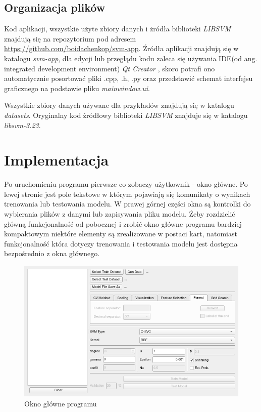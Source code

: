\documentclass[paper=a4, fontsize=11pt]{scrartcl} %
\numberwithin{equation}{section} %
\numberwithin{figure}{section} %
\begin{document}
    \endgroup

\subsection{Organizacja plików}
    \par Kod aplikacji, wszystkie użyte zbiory danych i żródła biblioteki \textit{LIBSVM}
    znajdują się na repozytorium pod adresem \url{https://github.com/boidachenkop/svm-app}.
    Źródła aplikacji znajdują się w katalogu \textit{svm-app}, dla edycji lub przeglądu kodu
    zaleca się używania IDE(od ang. integrated development environment) \textit{Qt Creator}
    \cite{qtcreator}, skoro potrafi ono automatycznie posortować pliki .cpp, .h, .py oraz
    przedstawić schemat interfejsu graficznego na podstawie pliku \textit{mainwindow.ui}.
    \par Wszystkie zbiory danych używane dla przykładów znajdują się w katalogu
    \textit{datasets}. Oryginalny kod żródłowy biblioteki \textit{LIBSVM} znajduje się w
    katalogu \textit{libsvm-3.23}.

\newpage
\section{Implementacja} %

    \par Po uruchomieniu programu pierwsze co zobaczy użytkownik - okno główne. Po lewej
    stronie jest pole tekstowe w którym pojawiają się komunikaty o wynikach trenowania lub
    testowania modelu. W prawej górnej części okna są kontrolki do wybierania plików z danymi
    lub zapisywania pliku modelu. Żeby rozdzielić główną funkcjonalność od pobocznej i zrobić
    okno główne programu bardziej kompaktowym niektóre elementy są zrealizowane w postaci kart,
    natomiast funkcjonalność która dotyczy trenowania i testowania modelu jest
    dostępna bezpośrednio z okna głównego.

    \begin{figure}[H]
        \begin{center}
            \includegraphics[scale=0.7]{./img/svm_app_main_window.png}
            \caption{Okno główne programu}
            \label{fig:main_window}
        \end{center}
    \end{figure}
\end{document}
